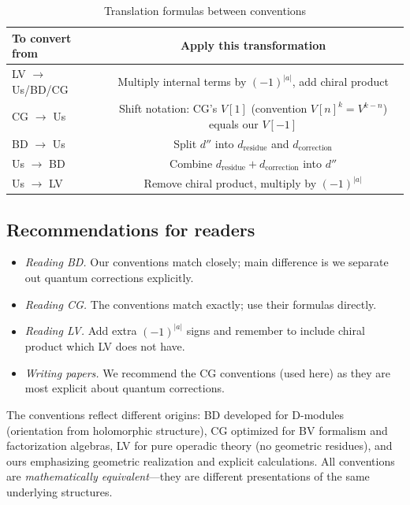 \begin{table}[H]
\centering
\caption{Translation formulas between conventions}
\begin{tabular}{|l|c|}
\hline
\textbf{To convert from} & \textbf{Apply this transformation} \\
\hline
\hline
LV $\to$ Us/BD/CG & Multiply internal terms by $(-1)^{|a|}$, add chiral product \\
\hline
CG $\to$ Us & Shift notation: CG's $V[1]$ (convention $V[n]^k = V^{k-n}$) equals our $V[-1]$ \\
\hline
BD $\to$ Us & Split $d''$ into $d_{\text{residue}}$ and $d_{\text{correction}}$ \\
\hline
Us $\to$ BD & Combine $d_{\text{residue}} + d_{\text{correction}}$ into $d''$ \\
\hline
Us $\to$ LV & Remove chiral product, multiply by $(-1)^{|a|}$ \\
\hline
\end{tabular}
\end{table}

\subsection{Recommendations for readers}

\begin{itemize}
\item \emph{Reading BD.} Our conventions match closely; main difference is we separate out
quantum corrections explicitly.
\item \emph{Reading CG.} The conventions match exactly; use their formulas directly.
\item \emph{Reading LV.} Add extra $(-1)^{|a|}$ signs and remember to include chiral product
which LV does not have.
\item \emph{Writing papers.} We recommend the CG conventions (used here) as they are most explicit about quantum corrections.
\end{itemize}

\begin{remark}
The conventions reflect different origins: BD developed for D-modules (orientation from holomorphic structure), CG optimized for BV formalism and factorization algebras, LV for pure operadic theory (no geometric residues), and ours emphasizing geometric realization and explicit calculations.
All conventions are \emph{mathematically equivalent}---they are different presentations of the same underlying structures.
\end{remark}
